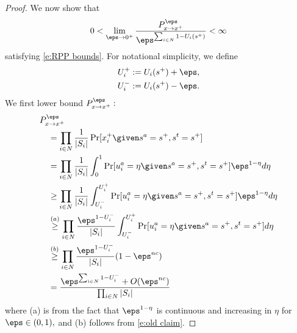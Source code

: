 \begin{proof}
We now show that
\begin{equation}
0 < \lim_{\eps\to 0^+} \frac{P^\eps_{x\to x^+}}{\eps^{\sum_{i\in N}1 - U_i(s^+)}}<\infty
\end{equation}
satisfying \eqref{e:RPP bounds}. For notational simplicity, we define 
\begin{align}
U_i^+	&:= U_i(s^+)+\eps,\nonumber\\
U_i^-	&:=U_i(s^+) - \eps.\label{e:u defns}
\end{align}
We first lower bound $P^\eps_{x\to x^+} :$
\small
{\allowdisplaybreaks[3]\begin{align}
&P^\eps_{x\to x^+}	\nonumber\\
			&\quad= \prod_{i\in N}{1\over|S_i|}\Pr[x_i^+ \given s^a = s^+, s^t =s^+]\nonumber\\
			&\quad= \prod_{i\in N}{1\over |S_i|}\int_0^1 \Pr[u_i^a = \eta \given s^a = s^+, s^t = s^+]\eps^{1-\eta}d\eta\nonumber\\
			&\quad\geq \prod_{i\in N}{1\over |S_i|}\int_{U_i^-}^{U_i^+}\Pr[u_i^a = \eta\given s^a = s^+, s^t = s^+ ]\eps^{1-\eta}d\eta\nonumber\\
			&\quad\stackrel{(a)}{\geq}\prod_{i\in N}{\eps^{1 - U_i^-}\over |S_i|}\int_{U_i^-}^{U_i^+} \Pr[u_i^a = \eta\given  s^a = s^+, s^t = s^+] d\eta\nonumber\\
			&\quad\stackrel{(b)}{\geq}\prod_{i\in N}{\eps^{1 - U_i^-}\over |S_i|}(1-\eps^{nc})\nonumber\\
			&\quad={\eps^{\sum_{i\in N} 1 - U_i^-} + O(\eps^{nc})\over\prod_{i\in N} |S_i|}\label{e:lb}%
\end{align}}
\normalsize
where
(a) is from the fact that $\eps^{1-\eta}$ is continuous and increasing in $\eta$ for $\eps\in(0,1),$ and 
(b) follows from \eqref{e:old claim}.  

\end{proof}
